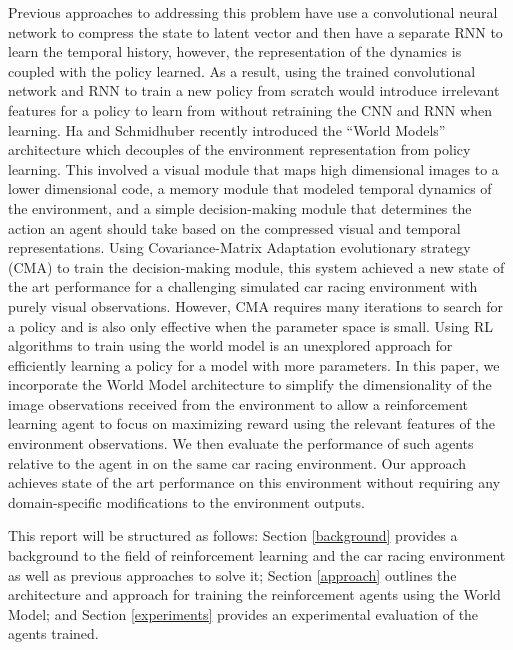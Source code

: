 Previous approaches to addressing this problem have use a convolutional neural network to compress the state to latent vector and then have a separate RNN to learn the temporal history, however, the representation of the dynamics is coupled with the policy learned. As a result, using the trained convolutional network and RNN to train a new policy from scratch would introduce irrelevant features for a policy to learn from without retraining the CNN and RNN when learning. Ha and Schmidhuber \cite{1.0.0} recently introduced the ``World Models'' architecture which decouples of the environment representation from policy learning. This involved a visual module that maps high dimensional images to a lower dimensional code, a memory module that modeled temporal dynamics of the environment, and a simple decision-making module that determines the action an agent should take based on the compressed visual and temporal representations. Using Covariance-Matrix Adaptation evolutionary strategy (CMA) \cite{1.0.3} to train the decision-making module, this system achieved a new state of the art performance for a challenging simulated car racing environment with purely visual observations. However, CMA requires many iterations to search for a policy and is also only effective when the parameter space is small. Using RL algorithms to train using the world model is an unexplored approach for efficiently learning a policy for a model with more parameters. In this paper, we incorporate the World Model architecture to simplify the dimensionality of the image observations received from the environment to allow a reinforcement learning agent to focus on maximizing reward using the relevant features of the environment observations. We then evaluate the performance of such agents relative to the agent in \cite{1.0.0} on the same car racing environment. Our approach achieves state of the art performance on this environment without requiring any domain-specific modifications to the environment outputs.

This report will be structured as follows: Section \ref{background} provides a background to the field of reinforcement learning and the car racing environment as well as previous approaches to solve it; Section \ref{approach} outlines the architecture and approach for training the reinforcement agents using the World Model; and Section \ref{experiments} provides an experimental evaluation of the agents trained.



